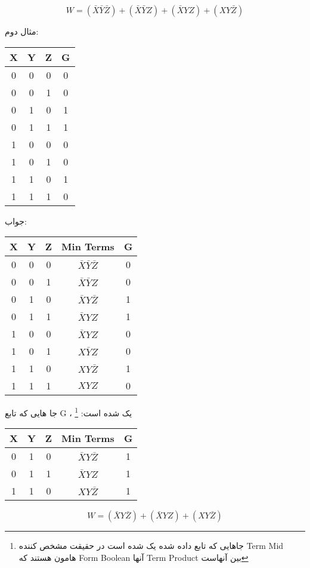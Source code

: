 \documentclass[pt, a5paper]{article}
\begin{document}
\begin{equation}
	W = (\bar{X} \bar{Y} \bar{Z}) +
	(\bar{X} \bar{Y} Z) +
	(\bar{X} Y Z) +
	(X Y \bar{Z})
\end{equation}
\newpage

مثال دوم:\\
\begin{LTR}
	\begin{tabular}{ c c c | c }		
		X & Y & Z & G \\
		\hline
		  0 & 0  & 0  &0 \\
		  0 & 0  & 1  &0 \\
		  0 & 1  & 0  &1 \\
		  0 & 1  & 1  &1 \\
		  1 & 0  & 0  &0 \\
		  1 & 0  & 1  &0 \\
		  1 & 1  & 0  &1 \\
		  1 & 1  & 1  &0 \\
	\end{tabular}
\end{LTR}
جواب:\\
\begin{LTR}
	\begin{tabular}{ c c c | c | c }		
		X & Y & Z & Min Terms & G \\
		\hline
		  0 & 0  & 0  & $\bar{X} \bar{Y} \bar{Z}$  &0 \\
		  0 & 0  & 1  & $\bar{X} \bar{Y} Z$  &0 \\
		  0 & 1  & 0  & $\bar{X} Y \bar{Z}$  &1 \\
		  0 & 1  & 1  & $\bar{X} Y Z$  &1 \\
		  1 & 0  & 0  & $\bar{X} Y Z$  &0 \\
		  1 & 0  & 1  & $X \bar{Y} Z$  &0 \\
		  1 & 1  & 0  & $X Y \bar{Z}$  &1 \\
		  1 & 1  & 1  & $X Y Z$  &0 \\
	\end{tabular}
\end{LTR}
\hfill \break
جا هایی که تابع G ، یک شده است:
\footnote{
جاهایی که تابع داده شده یک شده است در حقیقت مشخص کننده Term Mid هامون هستند که Form Boolean آنها Term Product بین آنهاست
}
\begin{LTR}
	\begin{tabular}{c c c | c | c }		
		X & Y & Z & Min Terms & G \\
		\hline
		  0 & 1  & 0  & $\bar{X} Y \bar{Z}$  &1 \\
		  0 & 1  & 1  & $\bar{X} Y Z$  &1 \\
		  1 & 1  & 0  & $X Y \bar{Z}$  &1 \\
	\end{tabular}
\end{LTR}
\begin{equation}
	W = (\bar{X} Y \bar{Z}) +
	(\bar{X} Y Z) +
	(X Y \bar{Z})
\end{equation}
\newpage
\end{document}
